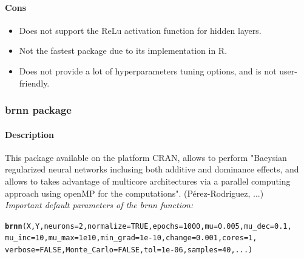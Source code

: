 \documentclass[letter]{article}\usepackage[]{graphicx}\usepackage[]{color}
\makeatletter
\newcommand{\hlnum}[1]{\textcolor[rgb]{0.686,0.059,0.569}{#1}}%
\newcommand{\hlstd}[1]{\textcolor[rgb]{0.345,0.345,0.345}{#1}}%
\newcommand{\hlkwc}[1]{\textcolor[rgb]{0.333,0.667,0.333}{#1}}%
\newcommand{\hlkwd}[1]{\textcolor[rgb]{0.737,0.353,0.396}{\textbf{#1}}}%
\newenvironment{kframe}{%
 \def\at@end@of@kframe{}%
 \ifinner\ifhmode%
  \def\at@end@of@kframe{\end{minipage}}%
  \begin{minipage}{\columnwidth}%
 \fi\fi%
 \def\FrameCommand##1{\hskip\@totalleftmargin \hskip-\fboxsep
 \colorbox{shadecolor}{##1}\hskip-\fboxsep
     \hskip-\linewidth \hskip-\@totalleftmargin \hskip\columnwidth}%
 \MakeFramed {\advance\hsize-\width
   \@totalleftmargin\z@ \linewidth\hsize
   \@setminipage}}%
 {\par\unskip\endMakeFramed%
 \at@end@of@kframe}
\newenvironment{knitrout}{}{} %
\makeatother
\begin{document}
\paragraph{Cons}
\begin{itemize}
\item Does not support the ReLu activation function for hidden layers.
\item Not the fastest package due to its implementation in R.
\item Does not provide a lot of hyperparameters tuning options, and is not user-friendly.
\end{itemize}

\subsubsection{brnn package}
\paragraph{Description}
This package available on the platform CRAN, allows to perform "Baeysian regularized neural networks inclusing both additive and dominance effects, and allows to takes advantage of multicore architectures via a parallel computing approach using openMP for the computations". (Pérez-Rodriguez, ...)\\
\textit{Important default parameters of the brnn function:}
\begin{knitrout}
\color{fgcolor}\begin{kframe}
\begin{alltt}
\hlkwd{brnn}\hlstd{(X,Y,}\hlkwc{neurons}\hlstd{=}\hlnum{2}\hlstd{,}\hlkwc{normalize}\hlstd{=}\hlnum{TRUE}\hlstd{,}\hlkwc{epochs}\hlstd{=}\hlnum{1000}\hlstd{,}\hlkwc{mu}\hlstd{=}\hlnum{0.005}\hlstd{,}\hlkwc{mu_dec}\hlstd{=}\hlnum{0.1}\hlstd{,}
\hlkwc{mu_inc}\hlstd{=}\hlnum{10}\hlstd{,}\hlkwc{mu_max}\hlstd{=}\hlnum{1e10}\hlstd{,}\hlkwc{min_grad}\hlstd{=}\hlnum{1e-10}\hlstd{,}\hlkwc{change} \hlstd{=} \hlnum{0.001}\hlstd{,}\hlkwc{cores}\hlstd{=}\hlnum{1}\hlstd{,}
\hlkwc{verbose}\hlstd{=}\hlnum{FALSE}\hlstd{,}\hlkwc{Monte_Carlo} \hlstd{=} \hlnum{FALSE}\hlstd{,}\hlkwc{tol} \hlstd{=} \hlnum{1e-06}\hlstd{,} \hlkwc{samples} \hlstd{=} \hlnum{40}\hlstd{,...)}
\end{alltt}
\end{kframe}
\end{knitrout}
\end{document}
